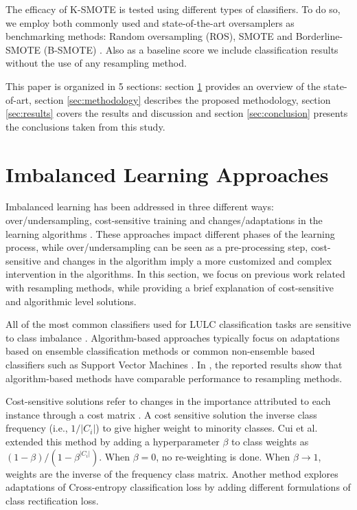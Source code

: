 \documentclass[remotesensing,article,submit,moreauthors,pdftex]{Definitions/mdpi}
\begin{document}
\begin{paracol}{2}
\linenumbers
\switchcolumn

The efficacy of K-SMOTE is tested using different types of classifiers. To do
so, we employ both commonly used and state-of-the-art oversamplers as
benchmarking methods: Random oversampling (ROS),  SMOTE and Borderline-SMOTE
(B-SMOTE) \cite{Han2005}. Also as a baseline score we include classification
results without the use of any resampling method.

This paper is organized in 5 sections: section \ref{sec:sota} provides an
overview of the state-of-art, section \ref{sec:methodology} describes the
proposed methodology, section \ref{sec:results} covers the results and
discussion and section \ref{sec:conclusion} presents the conclusions taken from
this study.

\section{Imbalanced Learning Approaches} \label{sec:sota}

Imbalanced learning has been addressed in three different ways:
over/undersampling, cost-sensitive training and changes/adaptations in the
learning algorithms \cite{Kaur2019}. These approaches impact different
phases of the learning process, while over/undersampling can be seen as a
pre-processing step, cost-sensitive and changes in the algorithm imply a more
customized and complex intervention in the algorithms. In this
section, we focus on previous work related with resampling methods, while
providing a brief explanation of cost-sensitive and algorithmic level solutions.

All of the most common classifiers used for LULC classification tasks
\cite{Khatami2016, Gavade2019} are sensitive to class imbalance
\cite{Blagus2010}. Algorithm-based approaches typically focus on adaptations
based on ensemble classification methods \cite{Mellor2015} or common
non-ensemble based classifiers such as Support Vector Machines \cite{Shao2014}.
In \cite{Lee2016}, the reported results show that algorithm-based methods have
comparable performance to resampling methods.

Cost-sensitive solutions refer to changes in the importance attributed to each
instance through a cost matrix \cite{Huang2016,Cui2019,Dong2017}. A
 cost sensitive solution
 the inverse class frequency (i.e., $1/|C_i|$) to give higher weight to
minority classes. Cui et al. \cite{Cui2019} extended this method by adding a
hyperparameter $\beta$ to class weights as $(1-\beta)/(1-\beta^{|C_i|})$. When
$\beta=0$, no re-weighting is done. When $\beta\rightarrow 1$, weights are the
inverse of the frequency class matrix. Another method \cite{Dong2017} explores
adaptations of Cross-entropy classification loss by adding different
formulations of class rectification loss.


\end{paracol}
\end{document}
